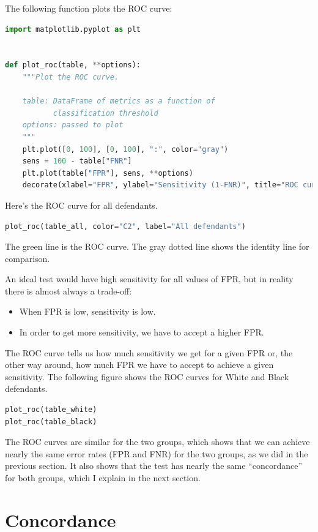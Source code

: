 The following function plots the ROC curve:

\begin{lstlisting}[language=Python,style=source]
import matplotlib.pyplot as plt


def plot_roc(table, **options):
    """Plot the ROC curve.

    table: DataFrame of metrics as a function of
           classification threshold
    options: passed to plot
    """
    plt.plot([0, 100], [0, 100], ":", color="gray")
    sens = 100 - table["FNR"]
    plt.plot(table["FPR"], sens, **options)
    decorate(xlabel="FPR", ylabel="Sensitivity (1-FNR)", title="ROC curve")
\end{lstlisting}

Here's the ROC curve for all defendants.

\begin{lstlisting}[language=Python,style=source]
plot_roc(table_all, color="C2", label="All defendants")
\end{lstlisting}

The green line is the ROC curve. The gray dotted line shows the identity
line for comparison.

An ideal test would have high sensitivity for all values of FPR, but in
reality there is almost always a trade-off:

\begin{itemize}
\item
  When FPR is low, sensitivity is low.
\item
  In order to get more sensitivity, we have to accept a higher FPR.
\end{itemize}

The ROC curve tells us how much sensitivity we get for a given FPR or,
the other way around, how much FPR we have to accept to achieve a given
sensitivity. The following figure shows the ROC curves for White and
Black defendants.

\begin{lstlisting}[language=Python,style=source]
plot_roc(table_white)
plot_roc(table_black)
\end{lstlisting}

The ROC curves are similar for the two groups, which shows that we can
achieve nearly the same error rates (FPR and FNR) for the two groups, as
we did in the previous section. It also shows that the test has nearly
the same ``concordance'' for both groups, which I explain in the next
section.

\hypertarget{concordance}{%
\section{Concordance}\label{concordance}}


